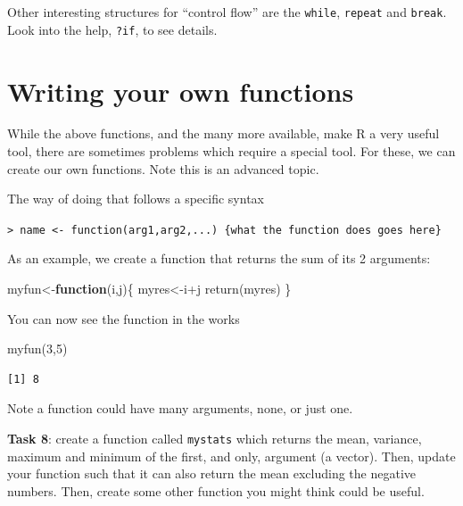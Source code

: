 \documentclass[
  letterpaper,
  DIV=11,
  numbers=noendperiod]{scrartcl}
\newenvironment{Shaded}{\begin{snugshade}}{\end{snugshade}}
\newcommand{\ControlFlowTok}[1]{\textcolor[rgb]{0.00,0.23,0.31}{\textbf{#1}}}
\newcommand{\DecValTok}[1]{\textcolor[rgb]{0.68,0.00,0.00}{#1}}
\newcommand{\FunctionTok}[1]{\textcolor[rgb]{0.28,0.35,0.67}{#1}}
\newcommand{\NormalTok}[1]{\textcolor[rgb]{0.00,0.23,0.31}{#1}}
\newcommand{\OtherTok}[1]{\textcolor[rgb]{0.00,0.23,0.31}{#1}}
\newcommand{\SpecialCharTok}[1]{\textcolor[rgb]{0.37,0.37,0.37}{#1}}
\newcounter{none} %
\begin{document}
Other interesting structures for ``control flow'' are the
\texttt{while}, \texttt{repeat} and \texttt{break}. Look into the help,
\texttt{?if}, to see details.

\section{Writing your own functions}\label{writing-your-own-functions}

While the above functions, and the many more available, make R a very
useful tool, there are sometimes problems which require a special tool.
For these, we can create our own functions. Note this is an advanced
topic.

The way of doing that follows a specific syntax

\texttt{\textgreater{}\ name\ \textless{}-\ function(arg1,arg2,...)\ \{what\ the\ function\ does\ goes\ here\}}

As an example, we create a function that returns the sum of its 2
arguments:

\begin{Shaded}
\begin{Highlighting}[]
\NormalTok{myfun}\OtherTok{\textless{}{-}}\ControlFlowTok{function}\NormalTok{(i,j)\{}
\NormalTok{  myres}\OtherTok{\textless{}{-}}\NormalTok{i}\SpecialCharTok{+}\NormalTok{j}
  \FunctionTok{return}\NormalTok{(myres)}
\NormalTok{\}}
\end{Highlighting}
\end{Shaded}

You can now see the function in the works

\begin{Shaded}
\begin{Highlighting}[]
\FunctionTok{myfun}\NormalTok{(}\DecValTok{3}\NormalTok{,}\DecValTok{5}\NormalTok{)}
\end{Highlighting}
\end{Shaded}

\begin{verbatim}
[1] 8
\end{verbatim}

Note a function could have many arguments, none, or just one.

\textbf{Task 8}: create a function called \texttt{mystats} which returns
the mean, variance, maximum and minimum of the first, and only, argument
(a vector). Then, update your function such that it can also return the
mean excluding the negative numbers. Then, create some other function
you might think could be useful.
\end{document}
